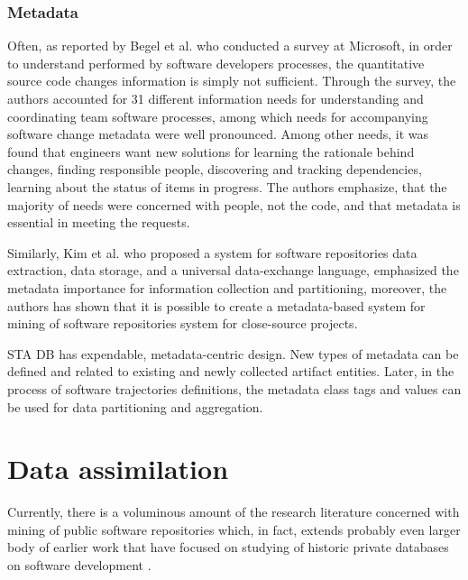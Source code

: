 \subsubsection{Metadata}
Often, as reported by Begel et al. \cite{citeulike:7260421} who conducted a survey at Microsoft, in order to understand performed 
by software developers processes, the quantitative source code changes information is simply not sufficient. Through the survey,
the authors accounted for 31 different information needs for understanding and coordinating team software processes, among 
which needs for accompanying software change metadata were well pronounced. Among other needs, it was found that engineers 
want new solutions for
learning the rationale behind
changes, finding responsible people, discovering and tracking dependencies, 
learning
about the status of items in progress. The authors emphasize, that the majority of needs were concerned with people, not 
the code, and that metadata is essential in meeting the requests.

Similarly, Kim et al. \cite{citeulike:4000311} who proposed a system for software repositories data extraction, data storage, 
and a universal data-exchange language, emphasized the metadata importance for information collection and partitioning, moreover, 
the authors has shown that it is possible to create a metadata-based system for mining of software repositories system for 
close-source projects.

STA DB has expendable, metadata-centric design. New types of metadata can be defined and related to existing and newly collected
artifact entities. Later, in the process of software trajectories definitions, the metadata class tags and values can be used 
for data partitioning and aggregation.

\section{Data assimilation}
Currently, there is a voluminous amount of the research literature concerned with mining of public software repositories 
\cite{citeulike:2710928} which, in fact, extends probably even larger body of earlier work that have focused on studying 
of historic private databases on software development \cite{citeulike:393158} \cite{citeulike:13125375} \cite{citeulike:13125481}.

